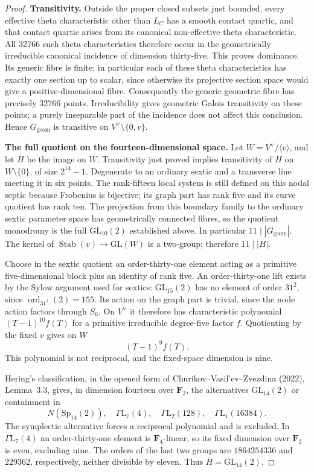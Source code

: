 \begin{proof}
\par\smallskip\noindent\textbf{Transitivity.}
Outside the proper closed subsets just bounded, every effective
theta characteristic other than $L_C$ has a smooth contact quartic,
and that contact quartic arises from its canonical non-effective
theta characteristic.  All $32766$ such theta characteristics
therefore occur in the geometrically irreducible canonical incidence
of dimension thirty-five.  This proves dominance.  Its generic
fibre is finite; in particular each of these theta characteristics
has exactly one section up to scalar, since otherwise its projective
section space would give a positive-dimensional fibre.  Consequently
the generic geometric fibre has precisely $32766$ points.
Irreducibility gives geometric Galois transitivity on these points;
a purely inseparable part of the incidence does not affect this
conclusion.  Hence $G_{\mathrm{geom}}$ is transitive on
$V^\vee\setminus\{0,v\}$.

\par\smallskip\noindent\textbf{The full quotient on the fourteen-dimensional space.}
Let $W=V^\vee/\langle v\rangle$, and let $H$ be the image on $W$.
Transitivity just proved implies transitivity of $H$ on
$W\setminus\{0\}$, of size $2^{14}-1$.
Degenerate to an ordinary sextic and a transverse line meeting it
in six points.  The rank-fifteen local system is still defined on
this nodal septic because Frobenius is bijective; its graph part
has rank five and its curve quotient has rank ten.  The projection
from this boundary family to the ordinary sextic parameter space
has geometrically connected fibres, so the quotient monodromy is
the full $\mathrm{GL}_{10}(2)$ established above.
In particular $11\mid|G_{\mathrm{geom}}|$.
The kernel of $\operatorname{Stab}(v)\to\mathrm{GL}(W)$ is a
two-group; therefore $11\mid|H|$.

Choose in the sextic quotient an order-thirty-one element acting
as a primitive five-dimensional block plus an identity of rank five.
An order-thirty-one lift exists by the Sylow argument used for
sextics: $\mathrm{GL}_{15}(2)$ has no element of order $31^2$, since
$\operatorname{ord}_{31^2}(2)=155$.
Its action on the graph part is trivial, since the node action
factors through $S_6$.  On $V^\vee$ it therefore has characteristic
polynomial $(T-1)^{10}f(T)$ for a primitive irreducible
degree-five factor $f$.  Quotienting by the fixed $v$ gives on $W$
\[
 (T-1)^9 f(T).
\]
This polynomial is not reciprocal, and the fixed-space dimension
is nine.

Hering's classification, in the opened form of
Churikov--Vasil'ev--Zvezdina (2022), Lemma~3.3, gives, in dimension
fourteen over $\mathbf F_2$, the alternatives
$\mathrm{GL}_{14}(2)$ or containment in
\[
 N(\mathrm{Sp}_{14}(2)),\quad
 \Gamma\mathrm L_7(4),\quad
 \Gamma\mathrm L_2(128),\quad
 \Gamma\mathrm L_1(16384).
\]
The symplectic alternative forces a reciprocal polynomial and is
excluded.  In $\Gamma\mathrm L_7(4)$ an order-thirty-one element
is $\mathbf F_4$-linear, so its fixed dimension over $\mathbf F_2$
is even, excluding nine.  The orders of the last two groups are
$1864254336$ and $229362$, respectively, neither divisible by eleven.
Thus $H=\mathrm{GL}_{14}(2)$.


\end{proof}
